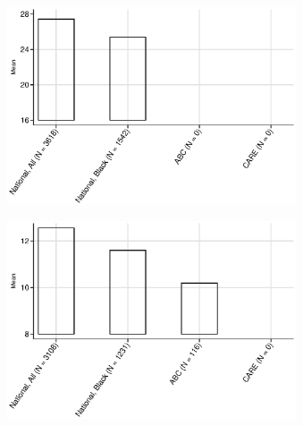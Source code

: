 \begin{figure}[H]
\caption{Family Environment Baseline Characteristics, ABC and CARE}  \label{figure:baselineabccare}
    \centering
\begin{subfigure}{.5\textwidth}
  \centering
  \includegraphics[height=2.3in]{output/abccarepsid_m_age0pool.eps}
\end{subfigure}%
\begin{subfigure}{.5\textwidth}
  \centering
  \includegraphics[height=2.3in]{output/abccarepsid_m_edu0pool.eps}
\end{subfigure}


\end{figure}
